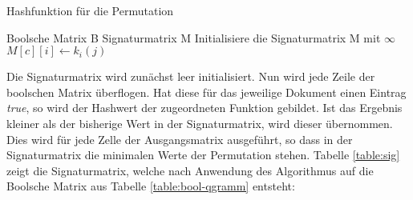 \begin{algorithm}[H]
\caption{Hashfunktion für die Permutation}
\label{algorithm:minhash-permutation}
\begin{algorithmic}[1]
 \renewcommand{\algorithmicrequire}{\textbf{Eingabe:}}
 \renewcommand{\algorithmicensure}{\textbf{Ausgabe:}}
\REQUIRE Boolsche Matrix B
\ENSURE Signaturmatrix M
\STATE Initialisiere die Signaturmatrix M mit $\infty$
\STATE $M[c][i] \leftarrow k_i(j)$
\ENDIF
\ENDFOR
\ENDIF
\ENDFOR
\end{algorithmic} %
\end{algorithm}
Die Signaturmatrix wird zunächst leer initialisiert.
Nun wird jede Zeile der boolschen Matrix überflogen.
Hat diese für das jeweilige Dokument einen Eintrag \textit{true}, so wird der Hashwert der zugeordneten Funktion gebildet.
Ist das Ergebnis kleiner als der bisherige Wert in der Signaturmatrix, wird dieser übernommen.
Dies wird für jede Zelle der Ausgangsmatrix ausgeführt, so dass in der Signaturmatrix die minimalen Werte der Permutation stehen.
Tabelle \ref{table:sig} zeigt die Signaturmatrix, welche nach Anwendung des Algorithmus auf die Boolsche Matrix aus Tabelle \ref{table:bool-qgramm} entsteht:

